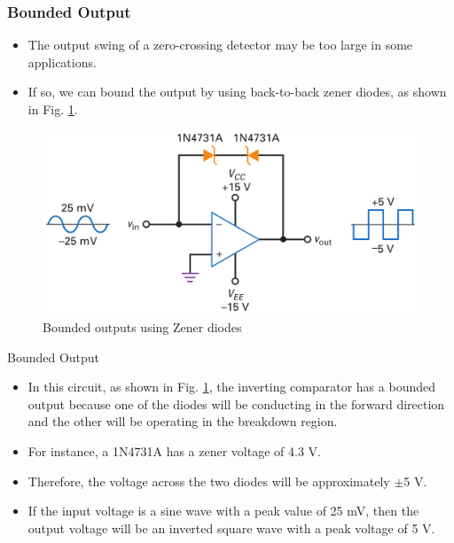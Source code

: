 \documentclass[pdflatex,compress]{beamer}
\begin{document}
\begin{frame}
	\frametitle{Bounded Output}
	\begin{itemize}
		\item The output swing of a zero-crossing detector may be too large in some applications.
		\item If so, we can bound the output by using back-to-back zener diodes, as shown in Fig. \ref{fig:207a}.
	\end{itemize}
	\begin{figure}
		\centering
		\includegraphics[width=0.7\linewidth]{img/207a}
		\caption{Bounded outputs using Zener diodes}
		\label{fig:207a}
	\end{figure}
\end{frame}

\begin{frame}{Bounded Output}
	\begin{itemize}
		\item In this circuit, as shown in Fig. \ref{fig:207a}, the inverting comparator has a bounded output because one of the diodes will be conducting in the forward direction and the other will be operating in the breakdown region.
		\item For instance, a 1N4731A has a zener voltage of 4.3 V.
		\item Therefore, the voltage across the two diodes will be approximately $\pm$5 V.
		\item If the input voltage is a sine wave with a peak value of 25 mV, then the output voltage will be an inverted square wave with a peak voltage of 5 V.
	\end{itemize}
\end{frame}
\end{document}
